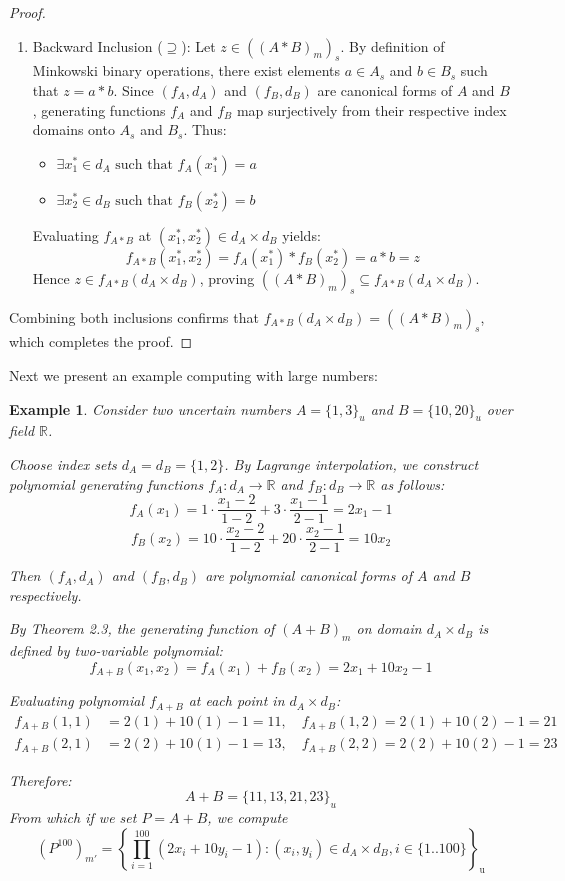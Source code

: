 \documentclass[a4paper,12pt, twoside]{memoir}
\newtheorem{example}{Example}[chapter]
\newcommand{\set}[1]{\left\{#1\right\}} %
\newcommand{\s}[1]{\set{#1}_\mathrm{u}} %
\newcommand{\kgdt}[1]{\left(#1\right)_m} %
\newcommand{\kgdtmr}[1]{\left(#1\right)_{m'}} %
\begin{document}
\begin{proof}
\begin{enumerate}[leftmargin=*]
		\item Backward Inclusion ($\supseteq$):
		      Let $z \in (\kgdt{A * B})_s$. By definition of Minkowski binary operations, there exist elements $a \in A_s$ and $b \in B_s$ such that $z = a * b$.
		      Since $(f_A, d_A)$ and $(f_B, d_B)$ are canonical forms of $A$ and $B$, generating functions $f_A$ and $f_B$ map surjectively from their respective index domains onto $A_s$ and $B_s$. Thus:
		      \begin{itemize}
			      \item $\exists x_1^* \in d_A \text{ such that } f_A(x_1^*) = a$
			      \item $\exists x_2^* \in d_B \text{ such that } f_B(x_2^*) = b$
		      \end{itemize}
		      Evaluating $f_{A*B}$ at $(x_1^*, x_2^*) \in d_A \times d_B$ yields:
		      \[
			      f_{A*B}(x_1^*, x_2^*) = f_A(x_1^*) * f_B(x_2^*) = a * b = z
		      \]
		      Hence $z \in f_{A*B}(d_A \times d_B)$, proving $(\kgdt{A * B})_s \subseteq f_{A*B}(d_A \times d_B)$.
	\end{enumerate}

	Combining both inclusions confirms that $f_{A*B}(d_A \times d_B) = (\kgdt{A * B})_s$, which completes the proof.
\end{proof}

Next we present an example computing with large numbers:

\begin{example}
	Consider two uncertain numbers $A = \{1, 3\}_u$ and $B = \{10, 20\}_u$ over field $\mathbb{R}$.

	Choose index sets $d_A = d_B = \{1, 2\}$. By Lagrange interpolation, we construct polynomial generating functions $f_A: d_A \to \mathbb{R}$ and $f_B: d_B \to \mathbb{R}$ as follows:
	$$f_A(x_1) = 1 \cdot \frac{x_1 - 2}{1 - 2} + 3 \cdot \frac{x_1 - 1}{2 - 1} = 2x_1 - 1$$
	$$f_B(x_2) = 10 \cdot \frac{x_2 - 2}{1 - 2} + 20 \cdot \frac{x_2 - 1}{2 - 1} = 10x_2$$

	Then $(f_A, d_A)$ and $(f_B, d_B)$ are polynomial canonical forms of $A$ and $B$ respectively.

	By Theorem 2.3, the generating function of $(A + B)_m$ on domain $d_A \times d_B$ is defined by two-variable polynomial:
	$$f_{A+B}(x_1, x_2) = f_A(x_1) + f_B(x_2) = 2x_1 + 10x_2 - 1$$

	Evaluating polynomial $f_{A+B}$ at each point in $d_A \times d_B$:
	\begin{align*}
		f_{A+B}(1, 1) & = 2(1) + 10(1) - 1 = 11, \quad f_{A+B}(1, 2) = 2(1) + 10(2) - 1 = 21 \\
		f_{A+B}(2, 1) & = 2(2) + 10(1) - 1 = 13, \quad f_{A+B}(2, 2) = 2(2) + 10(2) - 1 = 23
	\end{align*}

	Therefore:
	$$ A + B = \{11, 13, 21, 23\}_u$$
	From which if we set $P = A+B$, we compute
	\[\kgdtmr{P^{100}} = \s{\prod_{i=1}^{100}{(2x_i + 10 y_i - 1)}: (x_i,y_i) \in d_A \times d_B, i \in \{1..100\}}\]
\end{example}
\end{document}
